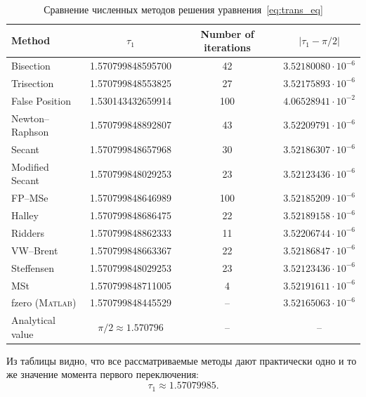 \documentclass[12pt,a4paper]{article}
\theoremstyle{bigplain}
\theoremstyle{plain}
\begin{document}
\vspace{10pt}
\begin{table}[htbp]
\centering
\small
\setlength{\tabcolsep}{6pt}
\renewcommand{\arraystretch}{1.15}




\begin{tabular}{@{}lccc@{}}
\toprule
\rowcolor{gray!30}
Method & $\tau_1$ & Number of iterations & $|\tau_1 - \pi/2|$ \\
\midrule
Bisection         & 1.570799848595700 & 42 & $3.52180080\cdot10^{-6}$ \\
Trisection        & 1.570799848553825 & 27 & $3.52175893\cdot10^{-6}$ \\
False Position    & 1.530143432659914 & 100 & $4.06528941\cdot10^{-2}$ \\
Newton--Raphson   & 1.570799848892807 & 43  & $3.52209791\cdot10^{-6}$ \\
Secant            & 1.570799848657968 & 30  & $3.52186307\cdot10^{-6}$ \\
Modified Secant   & 1.570799848029253 & 23 & $3.52123436\cdot10^{-6}$ \\
FP--MSe           & 1.570799848646989 & 100  & $3.52185209\cdot10^{-6}$ \\
Halley            & 1.570799848686475 & 22  & $3.52189158\cdot10^{-6}$ \\
Ridders           & 1.570799848862333 & 11  & $3.52206744\cdot10^{-6}$ \\
VW--Brent         & 1.570799848663367 & 22 & $3.52186847\cdot10^{-6}$ \\
Steffensen        & 1.570799848029253 & 23  & $3.52123436\cdot10^{-6}$ \\
MSt               & 1.570799848711005 & 4  & $3.52191611\cdot10^{-6}$ \\
fzero (\textsc{Matlab})  & 1.570799848445529 & --  & $3.52165063\cdot10^{-6}$ \\
\midrule
Analytical value  & $\pi/2 \approx 1.570796$ & -- & -- \\
\bottomrule
\end{tabular}

\caption{Сравнение численных методов решения уравнения~\eqref{eq:trans_eq}}
\label{tab:tau_compare}

\end{table}

Из таблицы видно, что все рассматриваемые методы
дают практически одно и то же значение момента
первого переключения:
\vspace{-10pt}
\[
\tau_1 \approx 1.57079985.
\]
\end{document}
